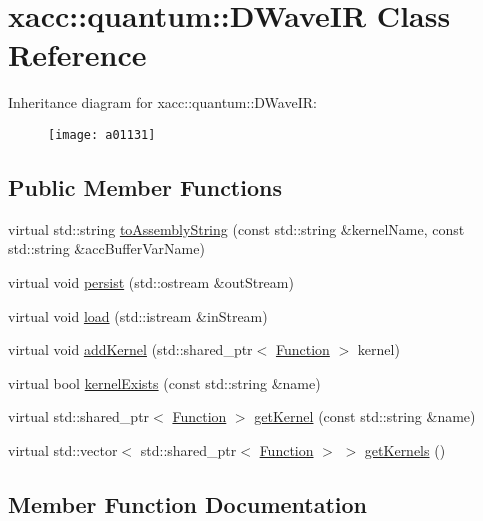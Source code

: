 \hypertarget{a01131}{}\section{xacc\+:\+:quantum\+:\+:D\+Wave\+IR Class Reference}
\label{a01131}
Inheritance diagram for xacc\+:\+:quantum\+:\+:D\+Wave\+IR\+:\begin{figure}[H]
\begin{center}
\leavevmode
\texttt{[image: a01131]}
\end{center}
\end{figure}
\subsection*{Public Member Functions}
\begin{DoxyCompactItemize}
\item 
virtual std\+::string \hyperlink{a01131_ac19ad098d5bbfe769809c10e26ebebc6}{to\+Assembly\+String} (const std\+::string \&kernel\+Name, const std\+::string \&acc\+Buffer\+Var\+Name)
\item 
virtual void \hyperlink{a01131_adac268c6fa2234902efeb9b3c07c0ac2}{persist} (std\+::ostream \&out\+Stream)
\item 
virtual void \hyperlink{a01131_a94d814172ec30c7ed32e6ab52bc2a41a}{load} (std\+::istream \&in\+Stream)
\item 
virtual void \hyperlink{a01131_a7e1ddff2771233dc45f60a6b7e15ef63}{add\+Kernel} (std\+::shared\+\_\+ptr$<$ \hyperlink{a01475}{Function} $>$ kernel)
\item 
virtual bool \hyperlink{a01131_ace9b8c6f4f29e32c8482fec4eacb637a}{kernel\+Exists} (const std\+::string \&name)
\item 
virtual std\+::shared\+\_\+ptr$<$ \hyperlink{a01475}{Function} $>$ \hyperlink{a01131_ac4295dfef98c94d7154a4fd39a6e5d1c}{get\+Kernel} (const std\+::string \&name)
\item 
virtual std\+::vector$<$ std\+::shared\+\_\+ptr$<$ \hyperlink{a01475}{Function} $>$ $>$ \hyperlink{a01131_accffbb279cb1f67e0fe79c603fe7a949}{get\+Kernels} ()
\end{DoxyCompactItemize}


\subsection{Member Function Documentation}
\mbox{\label{a01131_a7e1ddff2771233dc45f60a6b7e15ef63}} 

